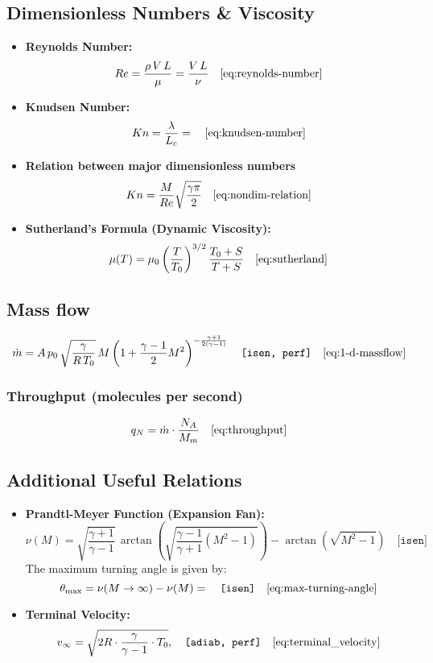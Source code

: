 \subsection*{Dimensionless Numbers \& Viscosity}
\begin{itemize}
    \item \textbf{Reynolds Number:}  
    $$
	    Re = \frac{\rho\,V\,L}{\mu} = \frac{V\,L}{\nu} \quad \eqref{eq:reynolds-number}
    $$
    \item \textbf{Knudsen Number:}  
    $$
	    Kn = \frac{\lambda}{L_c} = \quad \eqref{eq:knudsen-number}
    $$
	\item \textbf{Relation between major dimensionless numbers}
	$$
		Kn = \frac{M}{Re}\sqrt{\frac{\gamma \pi}{2}} \quad \eqref{eq:nondim-relation}
	$$
    \item \textbf{Sutherland’s Formula (Dynamic Viscosity):}  
    $$
	    \mu(T) = \mu_0\left(\frac{T}{T_0}\right)^{3/2}\frac{T_0+S}{T+S} \quad \eqref{eq:sutherland}
    $$
\end{itemize}

\subsection*{Mass flow}
$$
	\dot{m} = A\,p_0\,\sqrt{\frac{\gamma}{R\,T_0}}\,M\left(1+\frac{\gamma-1}{2}M^2\right)^{-\frac{\gamma+1}{2(\gamma-1)}} \quad \texttt{[isen, perf]} \quad \eqref{eq:1-d-massflow}
$$

\subsubsection*{Throughput (molecules per second)}
$$
	q_N = \dot{m} \cdot \frac{N_A}{M_m} \quad \eqref{eq:throughput}
$$

\subsection*{Additional Useful Relations}
\begin{itemize}
    \item \textbf{Prandtl-Meyer Function (Expansion Fan):}  
    $$
	    \nu(M) = \sqrt{\frac{\gamma+1}{\gamma-1}}\,\arctan\!\left(\sqrt{\frac{\gamma-1}{\gamma+1}(M^2-1)}\right) - \arctan\!\left(\sqrt{M^2-1}\right)
		\quad \texttt{[isen]}
    $$
    The maximum turning angle is given by:
    $$
	    \theta_{\text{max}} = \nu(M\to\infty) - \nu(M) = 
		\quad \texttt{[isen]}
		\quad \eqref{eq:max-turning-angle}
    $$
	\item \textbf{Terminal Velocity:}
	$$
		v_{\infty} = \sqrt{2R \cdot \frac{\gamma}{\gamma - 1} \cdot T_0},
		\quad \texttt{[adiab, perf]}
		\quad \eqref{eq:terminal_velocity}
	$$
\end{itemize}
